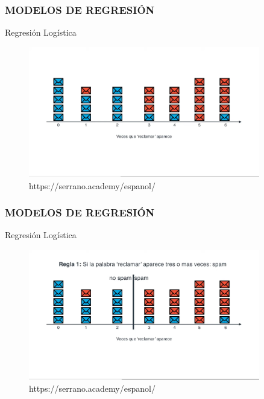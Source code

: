 \documentclass{beamer}
\begin{document}
\begin{frame}
	\frametitle{MODELOS DE REGRESIÓN}
	\begin{block}{Regresión Logística}	
		\begin{figure}
			\includegraphics[width=0.9\textwidth]{Imagenes_reg_log/IMG_3492.jpg}
			\caption{https://serrano.academy/espanol/}
		\end{figure}
	\end{block}
\end{frame}

\begin{frame}
	\frametitle{MODELOS DE REGRESIÓN}
	\begin{block}{Regresión Logística}	
		\begin{figure}
			\includegraphics[width=0.9\textwidth]{Imagenes_reg_log/IMG_3493.jpg}
			\caption{https://serrano.academy/espanol/}
		\end{figure}
	\end{block}
\end{frame}
\end{document}
